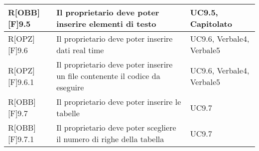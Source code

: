 \begin{table}[h]
\begin{tabular}{|p{}|p{}|p{}|}
R[OBB][F]9.5 & Il proprietario deve poter inserire elementi di testo & UC9.5, Capitolato \\ \midrule
R[OPZ][F]9.6 & Il proprietario deve poter inserire dati real time & UC9.6, Verbale4, Verbale5 \\ \midrule
R[OPZ][F]9.6.1 & Il proprietario deve poter inserire un file contenente il codice da eseguire  & UC9.6, Verbale4, Verbale5 \\ \midrule
R[OBB][F]9.7 & Il proprietario deve poter inserire le tabelle & UC9.7 \\ \midrule
R[OBB][F]9.7.1 & Il proprietario deve poter scegliere il numero di righe della tabella & UC9.7 \\ \midrule

		\end{tabular}
	\end{table}
	\newpage
	
